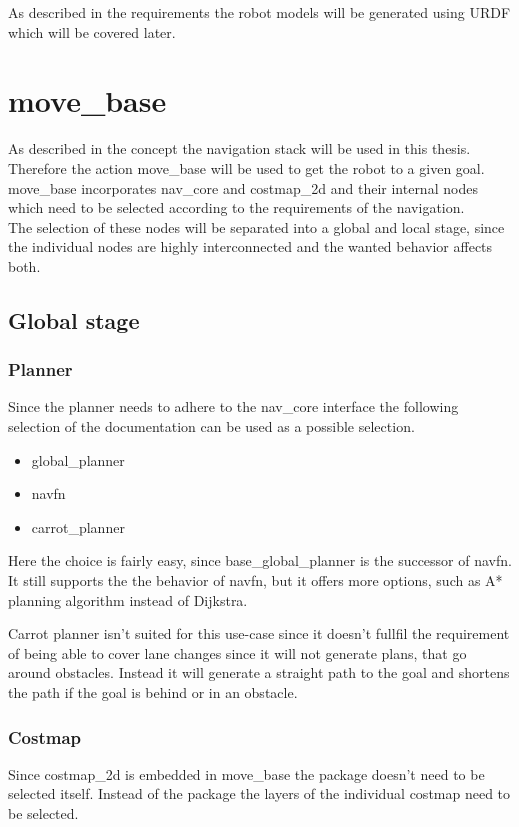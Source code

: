As described in the requirements the robot models will be generated using URDF which will be covered later.

\section{move\_base}

As described in the concept the navigation stack will be used in this thesis. Therefore the action move\_base will be used to get the robot to a given goal.\\
 move\_base incorporates nav\_core and costmap\_2d and their internal nodes which need to be selected according to the requirements of the navigation.\\ 
The selection of these nodes will be separated into a global and local stage, since the individual nodes are highly interconnected and the wanted behavior affects both.

\subsection{Global stage}

\subsubsection{Planner}

Since the planner needs to adhere to the nav\_core interface \cite{navcore} the following selection of the documentation can be used as a possible selection.

\begin{itemize}
	\item global\_planner
	\item navfn
	\item carrot\_planner
\end{itemize}


Here the choice is fairly easy, since base\_global\_planner is the successor of navfn. It still supports the the behavior of navfn, but it offers more options, such as A* planning algorithm instead of Dijkstra.


Carrot planner isn't suited for this use-case since it doesn't fullfil the requirement of being able to cover lane changes since it will not generate plans, that go around obstacles. Instead it will generate a straight path to the goal and shortens the path if the goal is behind or in an obstacle\cite{corrotplanner}.

\subsubsection{Costmap}
Since costmap\_2d is embedded in move\_base the package doesn't need to be selected itself. Instead of the package the layers of the individual costmap need to be selected.\\

